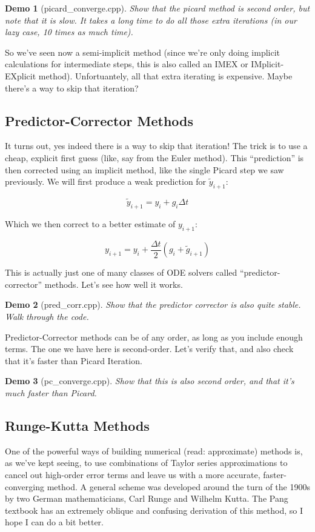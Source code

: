 \documentclass{article}
\theoremstyle{demo}
\newtheorem{demo}{Demo}[section]
\begin{document}
\begin{demo}[picard\_converge.cpp]
    Show that the picard method is second order, but note that it is slow.  It
    takes a long time to do all those extra iterations (in our lazy case, 10
    times as much time).
\end{demo}

So we've seen now a semi-implicit method (since we're only doing implicit
calculations for intermediate steps, this is also called an IMEX or
IMplicit-EXplicit method).  Unfortuantely, all that extra iterating is
expensive.  Maybe there's a way to skip that iteration?

\subsection{Predictor-Corrector Methods}
It turns out, yes indeed there is a way to skip that iteration!  The trick is to
use a cheap, explicit first guess (like, say from the Euler method).  This
``prediction'' is then corrected using an implicit method, like the single
Picard step we saw previously.  We will first produce a
weak prediction for $\tilde y_{i+1}$:

\begin{equation}
    \tilde y_{i+1} = y_i + g_i\Delta t
\end{equation}

Which we then correct to a better estimate of $y_{i+1}$:

\begin{equation}
    y_{i+1} = y_i + \frac{\Delta t}{2}(g_i+\tilde g_{i+1})
\end{equation}

This is actually just one of many classes of ODE solvers called
``predictor-corrector'' methods.  Let's see how well it works. 
\begin{demo}[pred\_corr.cpp]
    Show that the predictor corrector is also quite stable.  Walk through the
    code.
\end{demo}

Predictor-Corrector methods can be of any order, as long as you
include enough terms.  The one we have here is second-order.  Let's verify that,
and also check that it's faster than Picard Iteration.

\begin{demo}[pc\_converge.cpp]
    Show that this is also second order, and that it's much faster than Picard.
\end{demo}

\subsection{Runge-Kutta Methods}
One of the powerful ways of building numerical (read: approximate) methods is,
as we've kept seeing, to use combinations of Taylor series approximations to
cancel out high-order error terms and leave us with a more accurate,
faster-converging method.  A general scheme was developed around the turn of the
1900s by two German mathematicians, Carl Runge and Wilhelm Kutta.  The Pang
textbook has an extremely oblique and confusing derivation of this method, so I
hope I can do a bit better.
\end{document}
